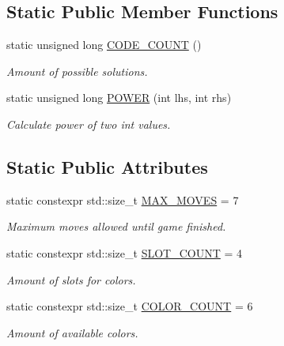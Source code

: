 \subsection*{Static Public Member Functions}
\begin{DoxyCompactItemize}
\item 
static unsigned long \hyperlink{classmastermind_1_1_mastermind_af22130e134506ecb5e756b931e759a03}{C\+O\+D\+E\+\_\+\+C\+O\+U\+NT} ()
\begin{DoxyCompactList}\small\item\em Amount of possible solutions. \end{DoxyCompactList}\item 
static unsigned long \hyperlink{classmastermind_1_1_mastermind_a24e1947e0ead0b7610b14dbeea618fbd}{P\+O\+W\+ER} (int lhs, int rhs)
\begin{DoxyCompactList}\small\item\em Calculate power of two int values. \end{DoxyCompactList}\end{DoxyCompactItemize}
\subsection*{Static Public Attributes}
\begin{DoxyCompactItemize}
\item 
static constexpr std\+::size\+\_\+t \hyperlink{classmastermind_1_1_mastermind_a8bbb0daf2ebb27f688f1a30cd4488be1}{M\+A\+X\+\_\+\+M\+O\+V\+ES} = 7
\begin{DoxyCompactList}\small\item\em Maximum moves allowed until game finished. \end{DoxyCompactList}\item 
static constexpr std\+::size\+\_\+t \hyperlink{classmastermind_1_1_mastermind_ad4cfc8127641ff8dfe89d65ae232331c}{S\+L\+O\+T\+\_\+\+C\+O\+U\+NT} = 4
\begin{DoxyCompactList}\small\item\em Amount of slots for colors. \end{DoxyCompactList}\item 
static constexpr std\+::size\+\_\+t \hyperlink{classmastermind_1_1_mastermind_a934035f0e608928076c4ce68b50d30f0}{C\+O\+L\+O\+R\+\_\+\+C\+O\+U\+NT} = 6
\begin{DoxyCompactList}\small\item\em Amount of available colors. \end{DoxyCompactList}\end{DoxyCompactItemize}


